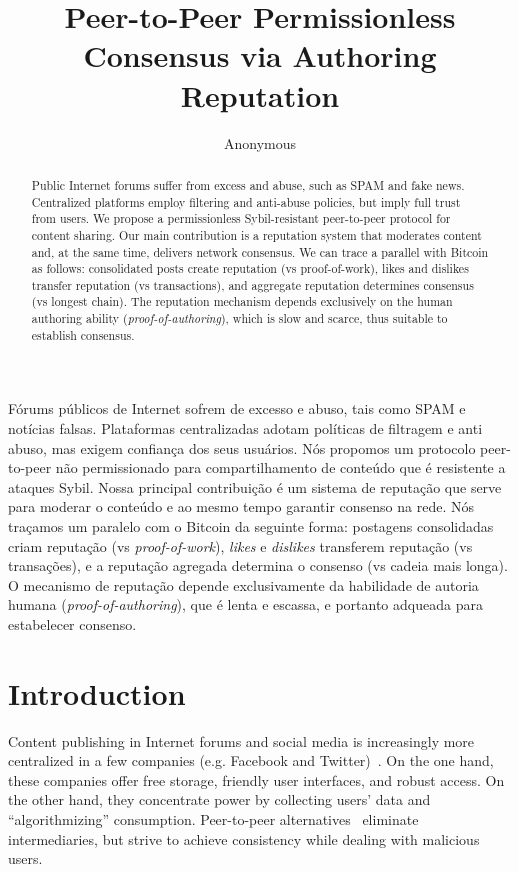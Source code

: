 \documentclass[12pt]{article}
\title{
    Peer-to-Peer Permissionless Consensus via Authoring Reputation
}
\author{Anonymous}
\begin{document}
\maketitle

\begin{abstract}
Public Internet forums suffer from excess and abuse, such as SPAM and fake
news.
Centralized platforms employ filtering and anti-abuse policies, but imply full
trust from users.
%
We propose a permissionless Sybil-resistant peer-to-peer protocol for content
sharing.
Our main contribution is a reputation system that moderates content and, at the
same time, delivers network consensus.
We can trace a parallel with Bitcoin as follows:
    consolidated posts create reputation (vs proof-of-work),
    likes and dislikes transfer reputation (vs transactions), and
    aggregate reputation determines consensus (vs longest chain).
%
The reputation mechanism depends exclusively on the human authoring ability
(\emph{proof-of-authoring}), which is slow and scarce, thus suitable to
establish consensus.
\end{abstract}

\begin{resumo} 
Fórums públicos de Internet sofrem de excesso e abuso, tais como SPAM e
notícias falsas.
Plataformas centralizadas adotam políticas de filtragem e anti abuso, mas
exigem confiança dos seus usuários.
%
Nós propomos um protocolo peer-to-peer não permissionado para compartilhamento
de conteúdo que é resistente a ataques Sybil.
Nossa principal contribuição é um sistema de reputação que serve para moderar o
conteúdo e ao mesmo tempo garantir consenso na rede.
%
Nós traçamos um paralelo com o Bitcoin da seguinte forma:
    postagens consolidadas criam reputação (vs \emph{proof-of-work}),
    \emph{likes} e \emph{dislikes} transferem reputação (vs transações), e
    a reputação agregada determina o consenso (vs cadeia mais longa).
%
O mecanismo de reputação depende exclusivamente da habilidade de autoria humana
(\emph{proof-of-authoring}), que é lenta e escassa, e portanto adqueada para
estabelecer consenso.
\end{resumo}

\section{Introduction}
\label{sec.introduction}

Content publishing in Internet forums and social media is
increasingly more centralized in a few companies (e.g. Facebook and
Twitter)~\cite{internet.fixing,p2p.osn,p2p.dosn}.
On the one hand, these companies offer free storage, friendly user interfaces,
and robust access.
On the other hand, they concentrate power by collecting users' data and
``algorithmizing'' consumption.
%
Peer-to-peer alternatives~\cite{p2p.survey} eliminate intermediaries, but
strive to achieve consistency while dealing with malicious users.
\end{document}
